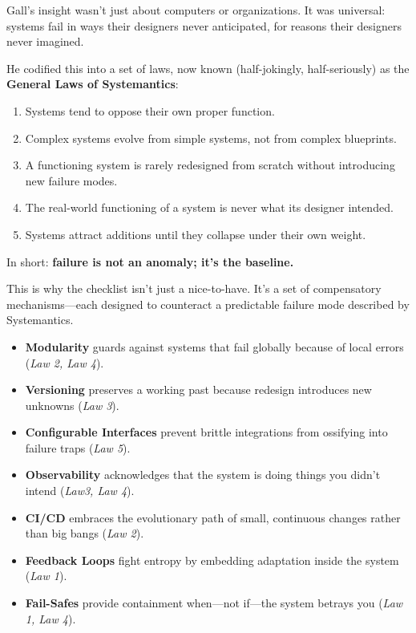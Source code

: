 Gall’s insight wasn’t just about computers or organizations. It was universal:  
systems fail in ways their designers never anticipated, for reasons their designers never imagined.

He codified this into a set of laws, now known (half-jokingly, half-seriously) as the \textbf{General Laws of Systemantics}:

\begin{enumerate}
    \item Systems tend to oppose their own proper function.
    \item Complex systems evolve from simple systems, not from complex blueprints.
    \item A functioning system is rarely redesigned from scratch without introducing new failure modes.
    \item The real-world functioning of a system is never what its designer intended.
    \item Systems attract additions until they collapse under their own weight.
\end{enumerate}

In short: \textbf{failure is not an anomaly; it’s the baseline.}

\medskip

This is why the checklist isn’t just a nice-to-have.  
It’s a set of compensatory mechanisms—each designed to counteract a predictable failure mode described by Systemantics.

\begin{itemize}
    \item \textbf{Modularity} guards against systems that fail globally because of local errors (\textit{Law 2, Law 4}).
    \item \textbf{Versioning} preserves a working past because redesign introduces new unknowns (\textit{Law 3}).
    \item \textbf{Configurable Interfaces} prevent brittle integrations from ossifying into failure traps (\textit{Law 5}).
    \item \textbf{Observability} acknowledges that the system is doing things you didn’t intend (\textit{Law3, Law 4}).
    \item \textbf{CI/CD} embraces the evolutionary path of small, continuous changes rather than big bangs (\textit{Law 2}).
    \item \textbf{Feedback Loops} fight entropy by embedding adaptation inside the system (\textit{Law 1}).
    \item \textbf{Fail-Safes} provide containment when—not if—the system betrays you (\textit{Law 1, Law 4}).
\end{itemize}

